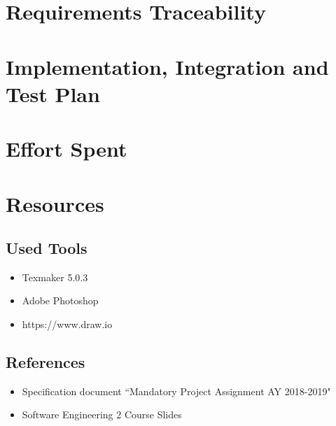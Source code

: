 \documentclass{article}
\begin{document}
\section{Requirements Traceability}
\newpage
\section{Implementation, Integration and Test Plan}
\newpage
\section{Effort Spent}
\newpage
\section{Resources}
\subsection{Used Tools}
\begin{itemize}
\item Texmaker 5.0.3
\item Adobe Photoshop
\item https://www.draw.io
\end{itemize}
\subsection{References}
\begin{itemize}
\item Specification document “Mandatory Project Assignment AY 2018-2019"
\item Software Engineering 2 Course Slides
\end{itemize}
\newpage
\end{document}
